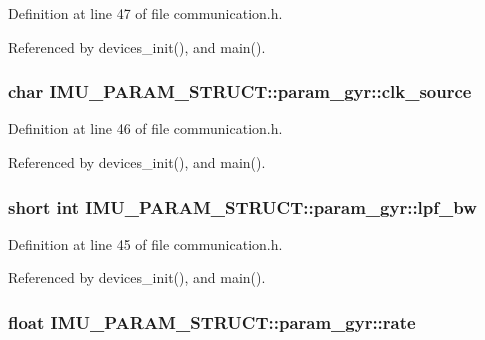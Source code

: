 Definition at line 47 of file communication.\-h.



Referenced by devices\-\_\-init(), and main().

\hypertarget{structIMU__PARAM__STRUCT_1_1param__gyr_aca3b791cb480f2da4703d4c256a7de48}{
\subsubsection[{clk\-\_\-source}]{\setlength{\rightskip}{0pt plus 5cm}char I\-M\-U\-\_\-\-P\-A\-R\-A\-M\-\_\-\-S\-T\-R\-U\-C\-T\-::param\-\_\-gyr\-::clk\-\_\-source}}\label{structIMU__PARAM__STRUCT_1_1param__gyr_aca3b791cb480f2da4703d4c256a7de48}


Definition at line 46 of file communication.\-h.



Referenced by devices\-\_\-init(), and main().

\hypertarget{structIMU__PARAM__STRUCT_1_1param__gyr_aa612f7299b43a1bf1fc597688c2fa02d}{
\subsubsection[{lpf\-\_\-bw}]{\setlength{\rightskip}{0pt plus 5cm}short int I\-M\-U\-\_\-\-P\-A\-R\-A\-M\-\_\-\-S\-T\-R\-U\-C\-T\-::param\-\_\-gyr\-::lpf\-\_\-bw}}\label{structIMU__PARAM__STRUCT_1_1param__gyr_aa612f7299b43a1bf1fc597688c2fa02d}


Definition at line 45 of file communication.\-h.



Referenced by devices\-\_\-init(), and main().

\hypertarget{structIMU__PARAM__STRUCT_1_1param__gyr_a5aa70e1e9634411c89aacfbc570cc91c}{
\subsubsection[{rate}]{\setlength{\rightskip}{0pt plus 5cm}float I\-M\-U\-\_\-\-P\-A\-R\-A\-M\-\_\-\-S\-T\-R\-U\-C\-T\-::param\-\_\-gyr\-::rate}}\label{structIMU__PARAM__STRUCT_1_1param__gyr_a5aa70e1e9634411c89aacfbc570cc91c}


